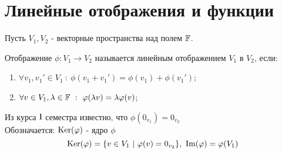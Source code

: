 \section{Линейные отображения и функции}
    Пусть $V_1, V_2$ - векторные пространства над полем $\F$.
    \begin{definition}
        Отображение $\phi: V_1 \rightarrow V_2$ называется линейным отображением $V_1$ в $V_2$, если:
        \begin{enumerate}
            \item $\forall v_1, v_1'\in V_1 \ : \ \phi(v_1 + v_1') = \phi(v_1) + \phi(v_1')$;
            \item $\forall v \in V_1, \lambda \in \F \ : \ \phi(\lambda v) = \lambda\phi(v)$;
        \end{enumerate}
        Из курса $\textup{I}$ семестра известно, что $\phi (0_{v_1}) = 0_{v_2}$  \\
        Обозначается: $\textup{Ker}(\phi)$ - ядро $\phi$
        $$\textup{Ker}(\phi) = \{v \in V_1 \ | \ \phi(v) = 0_{v_2}\}, \ \text{Im}(\phi) = \phi(V_1)$$ 
    \end{definition}

